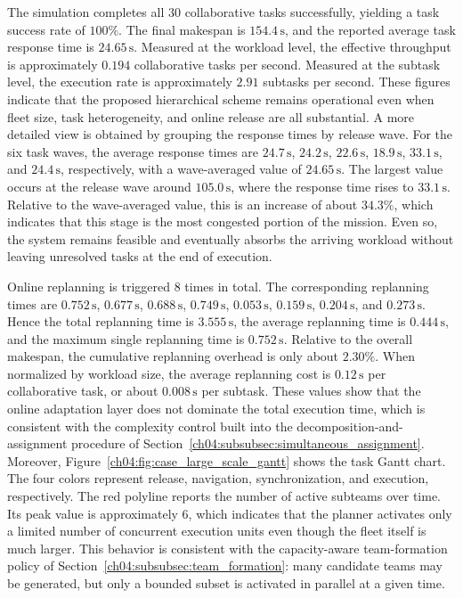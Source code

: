 The simulation completes all $30$ collaborative tasks successfully,
yielding a task success rate of $100\%$. The final makespan is
$154.4\,\mathrm{s}$, and the reported average task response time is
$24.65\,\mathrm{s}$. Measured at the workload level, the effective
throughput is approximately $0.194$ collaborative tasks per second.
Measured at the subtask level, the execution rate is approximately
$2.91$ subtasks per second. These figures indicate that the proposed
hierarchical scheme remains operational even when fleet size, task
heterogeneity, and online release are all substantial.
A more detailed view is obtained by grouping the response times by
release wave. For the six task waves, the average response times are
$24.7\,\mathrm{s}$, $24.2\,\mathrm{s}$, $22.6\,\mathrm{s}$,
$18.9\,\mathrm{s}$, $33.1\,\mathrm{s}$, and $24.4\,\mathrm{s}$,
respectively, with a wave-averaged value of $24.65\,\mathrm{s}$. The
largest value occurs at the release wave around $105.0\,\mathrm{s}$,
where the response time rises to $33.1\,\mathrm{s}$. Relative to the
wave-averaged value, this is an increase of about $34.3\%$, which
indicates that this stage is the most congested portion of the mission.
Even so, the system remains feasible and eventually absorbs the arriving
workload without leaving unresolved tasks at the end of execution.

Online replanning is triggered $8$ times in total. The corresponding
replanning times are
$0.752\,\mathrm{s}$, $0.677\,\mathrm{s}$, $0.688\,\mathrm{s}$,
$0.749\,\mathrm{s}$, $0.053\,\mathrm{s}$, $0.159\,\mathrm{s}$,
$0.204\,\mathrm{s}$, and $0.273\,\mathrm{s}$. Hence the total
replanning time is $3.555\,\mathrm{s}$, the average replanning time is
$0.444\,\mathrm{s}$, and the maximum single replanning time is
$0.752\,\mathrm{s}$. Relative to the overall makespan, the cumulative
replanning overhead is only about $2.30\%$. When normalized by workload
size, the average replanning cost is $0.12\,\mathrm{s}$ per
collaborative task, or about $0.008\,\mathrm{s}$ per subtask. These
values show that the online adaptation layer does not dominate the total
execution time, which is consistent with the complexity control built
into the decomposition-and-assignment procedure of
Section~\ref{ch04:subsubsec:simultaneous_assignment}.
Moreover, Figure~\ref{ch04:fig:case_large_scale_gantt} shows the task Gantt chart.
The four colors represent release, navigation, synchronization, and
execution, respectively. The red polyline reports the number of active
subteams over time. Its peak value is approximately $6$, which indicates
that the planner activates only a limited number of concurrent execution
units even though the fleet itself is much larger. This behavior is
consistent with the capacity-aware team-formation policy of
Section~\ref{ch04:subsubsec:team_formation}: many candidate teams
may be generated, but only a bounded subset is activated in parallel at
a given time.

